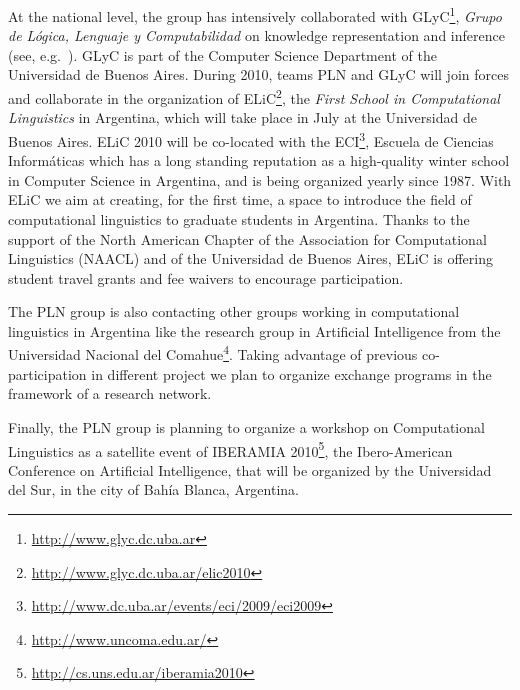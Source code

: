 At the national level, the group has intensively collaborated with GLyC\footnote{\url{http://www.glyc.dc.uba.ar}}, \emph{Grupo de L\'ogica,
Lenguaje y Computabilidad} on knowledge representation and inference 
(see, e.g.~\cite{AG06,AFFM08}). GLyC is part
of the Computer Science Department of the Universidad de Buenos Aires. 
During 2010, teams PLN and GLyC will join forces and collaborate in
the organization of ELiC\footnote{\url{http://www.glyc.dc.uba.ar/elic2010}}, 
the \emph{First School in Computational Linguistics} in Argentina,  which will
take place in July at the Universidad de Buenos Aires.  ELiC 2010 will be co-located 
with the ECI\footnote{\url{http://www.dc.uba.ar/events/eci/2009/eci2009}}, Escuela de Ciencias Inform\'aticas which has a
long standing reputation as a high-quality winter school in Computer Science in
Argentina, and is being organized yearly since 1987.
With ELiC we aim at creating, for the first time, a space to introduce the field of 
computational linguistics to graduate students in Argentina.  Thanks to the 
support of the North American Chapter of the Association for
Computational Linguistics (NAACL) and of the Universidad de Buenos Aires, 
ELiC is offering student travel grants and fee waivers to encourage participation.

The PLN group is also contacting other groups working in computational linguistics
in Argentina like the research group in Artificial Intelligence from the 
Universidad Nacional del Comahue\footnote{\url{http://www.uncoma.edu.ar/}}. Taking 
advantage of previous co-participation in different project we plan to organize
exchange programs in the framework of a research network. 

Finally, the PLN group is planning to organize a workshop on Computational
Linguistics as a satellite event of IBERAMIA 2010\footnote{\url{http://cs.uns.edu.ar/iberamia2010}}, 
the Ibero-American Conference on Artificial Intelligence, that will be organized by the Universidad
del Sur, in the city of Bah\'ia Blanca, Argentina. 
